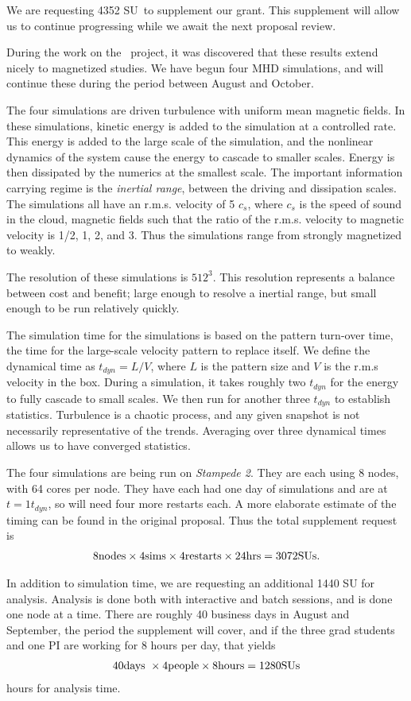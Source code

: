 
\def\request{4352 SU}

We are requesting \request\ to supplement our grant.  This supplement will allow
us to continue progressing while we await the next proposal review.

During the work on the \nameTurbulence\ project, it was discovered that these
results extend nicely to magnetized studies.  We have begun four MHD simulations,
and will continue these during the period between August and October.  

The four simulations are driven turbulence with uniform mean magnetic fields.
In these simulations, kinetic energy is added to the simulation at a controlled
rate.  This energy is added to the large scale of the simulation, and the
nonlinear dynamics of the system cause the energy to cascade to smaller scales.
Energy is then dissipated by the numerics at the smallest scale.    The
important information carrying regime is the \emph{inertial range}, between the
driving and dissipation scales.  The simulations all have an r.m.s. velocity of 5 $c_s$,
where $c_s$ is the speed of sound in the cloud, magnetic fields such that the
ratio of the r.m.s. velocity to magnetic velocity is 1/2, 1, 2, and 3.  Thus the
simulations range from strongly magnetized to weakly.

The resolution of these simulations is $512^3$.  This resolution represents a
balance between cost and benefit; large enough to resolve a inertial range, but
small enough to be run relatively quickly.  

The simulation time for the simulations is based on the pattern turn-over time, the time
for the large-scale velocity pattern to replace itself.  We define the dynamical
time as
$t_{dyn} =L/V$, where $L$ is the pattern size and $V$ is the r.m.s velocity in
the box.  During a simulation, it takes roughly two $t_{dyn}$ for the energy to
fully cascade to small scales.  We then run for another three $t_{dyn}$ to
establish statistics.  Turbulence is a chaotic process, and any given snapshot
is not necessarily representative of the trends.  Averaging over three dynamical
times allows us to have converged statistics.

The four simulations are being run on \emph{Stampede 2}.  They are each using 8
nodes, with 64 cores per node.  They have each had one day of simulations and
are at $t=1 t_{dyn}$, so will need four more restarts each.  A more elaborate
estimate of the timing can be found in the original proposal.  Thus the total
supplement request is 
\begin{align}
8 \rm{nodes} \times 4 \rm{sims} \times 4 \rm{restarts} \times 24 \rm{hrs} =
3072 SUs.
\end{align}

In addition to simulation time, we are requesting an additional 1440 SU for
analysis.  Analysis is done both with interactive and batch sessions, and is
done one node at a time.  There are roughly 40 business days in August and
September, the period the supplement will cover, and if the three grad students
and one PI are working for 8 hours per day, that yields 
\begin{align}
    40 \rm{days}\ \times 4 \rm{people} \times 8 \rm{hours}=1280 \rm{SUs}
\end{align}
hours for analysis time.

